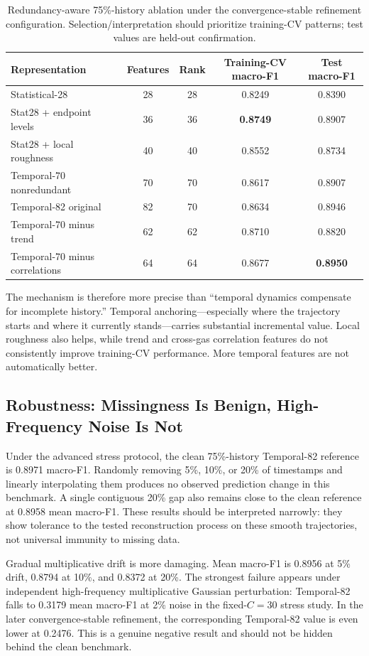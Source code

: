 \documentclass[conference]{IEEEtran}
\begin{document}
\begin{table}[t]
\caption{Redundancy-aware 75\%-history ablation under the convergence-stable refinement configuration. Selection/interpretation should prioritize training-CV patterns; test values are held-out confirmation.}
\label{tab:ablationnew}
\centering
\footnotesize
\begin{tabular}{lcccc}
\toprule
Representation & Features & Rank & Training-CV macro-F1 & Test macro-F1 \\
\midrule
Statistical-28 & 28 & 28 & 0.8249 & 0.8390 \\
Stat28 + endpoint levels & 36 & 36 & \textbf{0.8749} & 0.8907 \\
Stat28 + local roughness & 40 & 40 & 0.8552 & 0.8734 \\
Temporal-70 nonredundant & 70 & 70 & 0.8617 & 0.8907 \\
Temporal-82 original & 82 & 70 & 0.8634 & 0.8946 \\
Temporal-70 minus trend & 62 & 62 & 0.8710 & 0.8820 \\
Temporal-70 minus correlations & 64 & 64 & 0.8677 & \textbf{0.8950} \\
\bottomrule
\end{tabular}
\end{table}

The mechanism is therefore more precise than ``temporal dynamics compensate for incomplete history.'' Temporal anchoring---especially where the trajectory starts and where it currently stands---carries substantial incremental value. Local roughness also helps, while trend and cross-gas correlation features do not consistently improve training-CV performance. More temporal features are not automatically better.

\subsection{Robustness: Missingness Is Benign, High-Frequency Noise Is Not}
Under the advanced stress protocol, the clean 75\%-history Temporal-82 reference is 0.8971 macro-F1. Randomly removing 5\%, 10\%, or 20\% of timestamps and linearly interpolating them produces no observed prediction change in this benchmark. A single contiguous 20\% gap also remains close to the clean reference at 0.8958 mean macro-F1. These results should be interpreted narrowly: they show tolerance to the tested reconstruction process on these smooth trajectories, not universal immunity to missing data.

Gradual multiplicative drift is more damaging. Mean macro-F1 is 0.8956 at 5\% drift, 0.8794 at 10\%, and 0.8372 at 20\%. The strongest failure appears under independent high-frequency multiplicative Gaussian perturbation: Temporal-82 falls to 0.3179 mean macro-F1 at 2\% noise in the fixed-$C=30$ stress study. In the later convergence-stable refinement, the corresponding Temporal-82 value is even lower at 0.2476. This is a genuine negative result and should not be hidden behind the clean benchmark.
\end{document}
